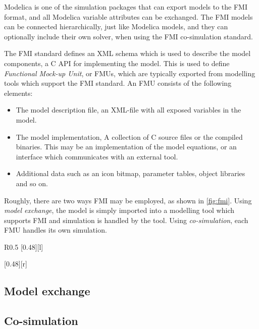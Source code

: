 \documentclass[\rootfolder/main.tex]{subfiles}
\begin{document}
Modelica is one of the simulation packages that can export models to the FMI format, and all Modelica variable attributes can be exchanged.
The FMI models can be connected hierarchically, just like Modelica models, and they can optionally include their own solver, when using the FMI co-simulation standard.

The FMI standard defines an XML schema which is used to describe the model components, a C API for implementing the model.
This is used to define \emph{Functional Mock-up Unit}, or FMUs, which are typically exported from modelling tools which support the FMI standard.
An FMU consists of the following elements:

\begin{itemize}
    \item The model description file, an XML-file with all exposed variables in the model.
    \item The model implementation, A collection of C source files or the compiled binaries.
        This may be an implementation of the model equations, or an interface which communicates with an external tool.
    \item Additional data such as an icon bitmap, parameter tables, object libraries and so on.
\end{itemize}

Roughly, there are two ways FMI may be employed, as shown in \cref{fig:fmi}.
Using \emph{model exchange}, the model is simply imported into a modelling tool which supports FMI and simulation is handled by the tool.
Using \emph{co-simulation}, each FMU handles its own simulation.

\begin{wrapfigure}{R}{0.5\columnwidth}
    \centering
    [0.48\columnwidth][l]{}\par\bigskip
    [0.48\columnwidth][r]{}
    \caption{The two interface standards for FMI.\label{fig:fmi}}
\end{wrapfigure}

\subsection{Model exchange}

\subsection{Co-simulation}
\end{document}
